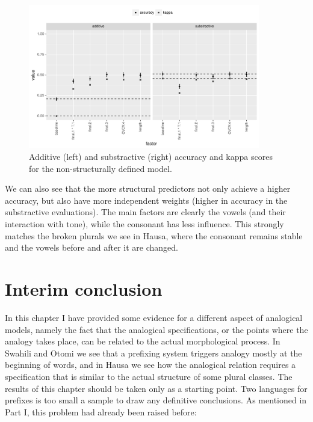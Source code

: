 \begin{figure}[!htpb]
    \centering
    \includegraphics[width=0.9\textwidth]{./figures/hausa/nostruc-overall.pdf}
    \caption{Additive (left) and substractive (right) accuracy and kappa scores for the non-structurally defined model.}\label{fig:nostruc-overall}
\end{figure}

We can also see that the more structural predictors not only achieve a higher accuracy, but also have more independent weights (higher in accuracy in the substractive evaluations). The main factors are clearly the vowels (and their interaction with tone), while the consonant has less influence. This strongly matches the broken plurals we see in Hausa, where the consonant remains stable and the vowels before and after it are changed.


\section{Interim conclusion}

In this chapter I have provided some evidence for a different aspect of analogical models, namely the fact that the analogical specifications, or the points where the analogy takes place, can be related to the actual morphological process. In Swahili and Otomi we see that a prefixing system triggers analogy mostly at the beginning of words, and in Hausa we see how the analogical relation requires a specification that is similar to the actual structure of some plural classes. The results of this chapter should be taken only as a starting point. Two languages for prefixes is too small a sample to draw any definitive conclusions. As mentioned in Part I, this problem had already been raised before:


